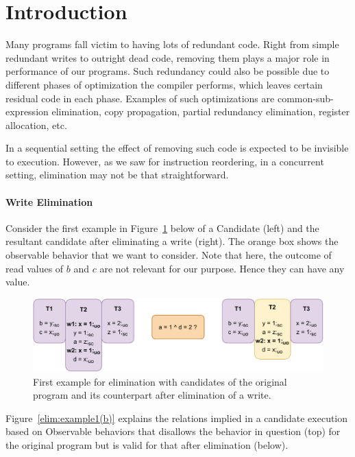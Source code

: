 \section{Introduction}

    Many programs fall victim to having lots of redundant code.
    Right from simple redundant writes to outright dead code, removing them plays a major role in performance of our programs. 
    Such redundancy could also be possible due to different phases of optimization the compiler performs, which leaves certain residual code in each phase.
    Examples of such optimizations are common-sub-expression elimination, copy propagation, partial redundancy elimination, register allocation, etc.
    
    In a sequential setting the effect of removing such code is expected to be invisible to execution.    
    However, as we saw for instruction reordering, in a concurrent setting, elimination may not be that straightforward. 
    
    \paragraph{Write Elimination}
    
        Consider the first example in Figure~\ref{elim:example1(a)} below of a Candidate (left) and the resultant candidate after eliminating a write (right).
        The orange box shows the observable behavior that we want to consider. 
        Note that here, the outcome of read values of $b$ and $c$ are not relevant for our purpose. Hence they can have any value.
        \begin{figure}[H]
            \centering
            \includegraphics[scale=0.7]{5.Elimination/EliminationExample1(a).pdf}
            \caption{First example for elimination with candidates of the original program and its counterpart after elimination of a write.} 
            \label{elim:example1(a)}
        \end{figure}

        Figure~\ref{elim:example1(b)} explains the relations implied in a candidate execution based on Observable behaviors that disallows the behavior in question (top) for the original program but is valid for that after elimination (below). 

